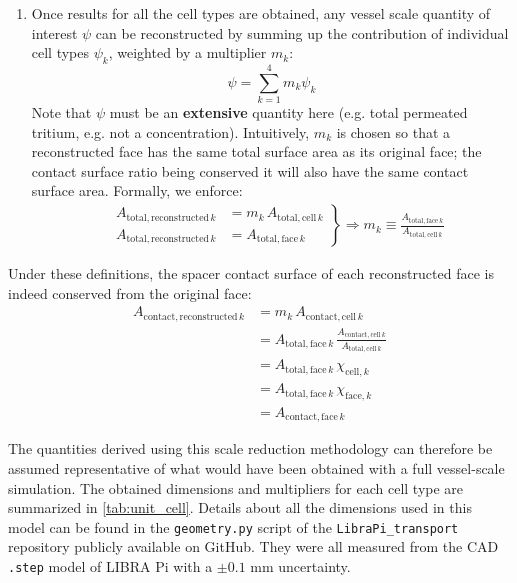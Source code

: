 \documentclass[a4paper,11pt,oneside]{report}
\begin{document}
\begin{enumerate}
    \item Once results for all the cell types are obtained, any vessel scale quantity of interest $\psi$ can be reconstructed by summing up the contribution of individual cell types $\psi_k$, weighted by a multiplier $m_k$:
    \begin{equation}
        \psi=\sum_{k=1}^4 m_k \psi_k
    \end{equation}
    Note that $\psi$ must be an \textbf{extensive} quantity here (e.g. total permeated tritium, e.g. not a concentration). Intuitively, $m_k$ is chosen so that a reconstructed face has the same total surface area as its original face; the contact surface ratio being conserved it will also have the same contact surface area. Formally, we enforce:
    \begin{align}
        \left.
        \begin{array}{rcl}
        &A_{\mathrm{total, reconstructed}\,k} &= m_k \,A_{\mathrm{total, cell}\,k}\\
        &A_{\mathrm{total, reconstructed}\,k} &= A_{\mathrm{total, face}\,k}
        \end{array}\right\} \Rightarrow m_k \equiv \frac{A_{\mathrm{total, face}\,k}}{A_{\mathrm{total, cell}\,k}}
    \end{align}
\end{enumerate}

Under these definitions, the spacer contact surface of each reconstructed face is indeed conserved from the original face:
\begin{align*}
    A_{\mathrm{contact, reconstructed}\,k} &= m_k \,A_{\mathrm{contact, cell}\,k}\\
    &=A_{\mathrm{total, face}\,k}\,\frac{A_{\mathrm{contact, cell}\,k}}{A_{\mathrm{total, cell}\,k}}\\
    &=A_{\mathrm{total, face}\,k}\,\chi_{\mathrm{cell},k}\\
    &=A_{\mathrm{total, face}\,k}\,\chi_{\mathrm{face},k}\\
    &=A_{\mathrm{contact, face}\,k}
\end{align*}

The quantities derived using this scale reduction methodology can therefore be assumed representative of what would have been obtained with a full vessel-scale simulation. The obtained dimensions and multipliers for each cell type are summarized in \cref{tab:unit_cell}. Details about all the dimensions used in this model can be found in the \verb|geometry.py| script of the \verb|LibraPi_transport| repository publicly available on GitHub. They were all measured from the CAD \verb|.step| model of LIBRA Pi with a $\pm0.1$ mm uncertainty.
\end{document}
